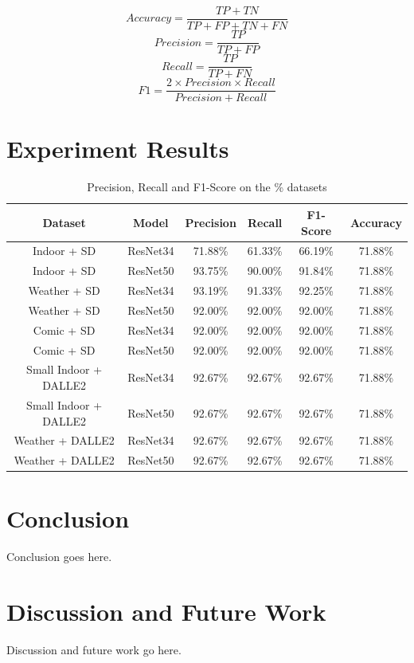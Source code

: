 \documentclass[11pt]{article}
\begin{document}
\[
Accuracy = \frac{TP+TN}{TP+FP+TN+FN}
\]
\[
Precision = \frac{TP}{TP+FP}
\]
\[
Recall = \frac{TP}{TP+FN}
\]
\[
F1 = \frac{2 \times Precision \times Recall}{Precision + Recall}
\]


\section{Experiment Results}

\begin{table}
  \centering
  \begin{tabular}{c|c||c|c|c|c}
    \hline
    \textbf{Dataset} & \textbf{Model} & \textbf{Precision} & \textbf{Recall} & \textbf{F1-Score} & \textbf{Accuracy} \\
    \hline
    Indoor + SD & ResNet34       & {71.88\%}          & {61.33\%}       & {66.19\%}      & {71.88\%}    \\
    Indoor + SD & ResNet50           & {93.75\%}          & {90.00\%}       & {91.84\%}      & {71.88\%}    \\
    Weather + SD & ResNet34  & {93.19\%}          & {91.33\%}       & {92.25\%}       & {71.88\%}   \\
    Weather + SD & ResNet50       & {92.00\%}          & {92.00\%}       & {92.00\%}      & {71.88\%}    \\
    Comic + SD & ResNet34 & {92.00\%}          & {92.00\%}       & {92.00\%}      & {71.88\%}    \\
    Comic + SD & ResNet50 & {92.00\%}          & {92.00\%}       & {92.00\%}      & {71.88\%}    \\
    Small Indoor + DALLE2 & ResNet34 & {92.67\%}          & {92.67\%}       & {92.67\%}      & {71.88\%}    \\
    Small Indoor + DALLE2 & ResNet50 & {92.67\%}          & {92.67\%}       & {92.67\%}      & {71.88\%}    \\
    Weather + DALLE2 & ResNet34 & {92.67\%}          & {92.67\%}       & {92.67\%}      & {71.88\%}    \\
    Weather + DALLE2 & ResNet50 & {92.67\%}          & {92.67\%}       & {92.67\%}      & {71.88\%}    \\
    \hline
  \end{tabular}
  \caption{Precision, Recall and F1-Score on the \% datasets}
  \label{tab:results-on-datasets}
\end{table}


\section{Conclusion}

Conclusion goes here.

\section{Discussion and Future Work}

Discussion and future work go here.



\end{document}
